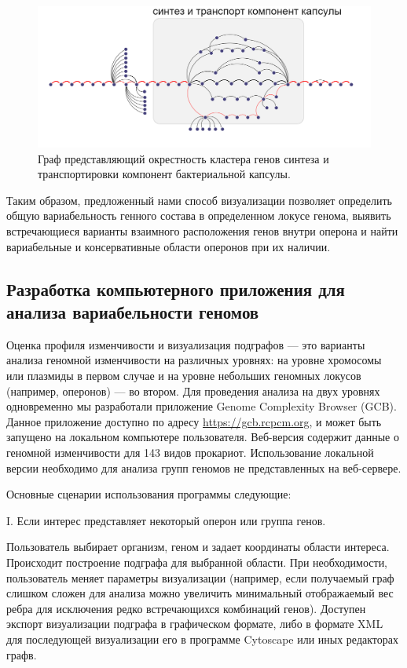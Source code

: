 \begin{figure}[!ht] 
  \center
    \includegraphics[width=\textwidth]{Dissertation/images/subgraphs/capsular_subgraph.png}
  \caption{Граф представляющий окрестность кластера генов синтеза и транспортировки компонент бактериальной капсулы. }
  \label{img:capsule_sub_small} 
\end{figure}

Таким образом, предложенный нами способ визуализации позволяет определить общую вариабельность генного состава в определенном локусе генома, выявить встречающиеся варианты взаимного расположения генов внутри оперона и найти вариабельные и консервативные области оперонов при их наличии.

\subsection*{Разработка компьютерного приложения для анализа вариабельности геномов} \label{chaptGCB}

Оценка профиля изменчивости и визуализация подграфов --- это варианты анализа геномной изменчивости на различных уровнях: на уровне хромосомы или плазмиды в первом случае и на уровне небольших геномных локусов (например, оперонов) --- во втором. Для проведения анализа на двух уровнях одновременно мы разработали приложение Genome Complexity Browser (GCB). Данное приложение доступно по адресу \url{https://gcb.rcpcm.org}, и может быть запущено на локальном компьютере пользователя. Веб-версия содержит данные о геномной изменчивости для 143 видов прокариот. Использование локальной версии необходимо для анализа групп геномов не представленных на веб-сервере.

Основные сценарии использования программы следующие:

I. Если интерес представляет некоторый оперон или группа генов.

Пользователь выбирает организм, геном и задает координаты области интереса. Происходит построение подграфа для выбранной области. При необходимости, пользователь меняет параметры визуализации (например, если получаемый граф слишком сложен для анализа можно увеличить минимальный отображаемый вес ребра для исключения редко встречающихся комбинаций генов). Доступен экспорт визуализации подграфа в графическом формате, либо в формате XML для последующей визуализации его в программе Cytoscape или иных редакторах графв. 

